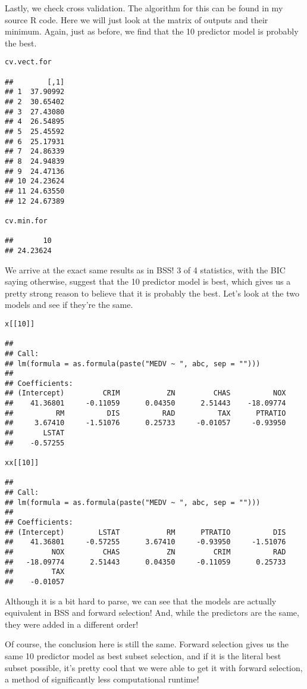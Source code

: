\documentclass[]{article}
\begin{document}
Lastly, we check cross validation. The algorithm for this can be found
in my source R code. Here we will just look at the matrix of outputs and
their minimum. Again, just as before, we find that the 10 predictor
model is probably the best.

\begin{verbatim}
cv.vect.for

##        [,1]
## 1  37.90992
## 2  30.65402
## 3  27.43080
## 4  26.54895
## 5  25.45592
## 6  25.17931
## 7  24.86339
## 8  24.94839
## 9  24.47136
## 10 24.23624
## 11 24.63550
## 12 24.67389

cv.min.for

##       10 
## 24.23624
\end{verbatim}

We arrive at the exact same results as in BSS! 3 of 4 statistics, with
the BIC saying otherwise, suggest that the 10 predictor model is best,
which gives us a pretty strong reason to believe that it is probably the
best. Let's look at the two models and see if they're the same.

\begin{verbatim}
x[[10]]

## 
## Call:
## lm(formula = as.formula(paste("MEDV ~ ", abc, sep = "")))
## 
## Coefficients:
## (Intercept)         CRIM           ZN         CHAS          NOX  
##    41.36801     -0.11059      0.04350      2.51443    -18.09774  
##          RM          DIS          RAD          TAX      PTRATIO  
##     3.67410     -1.51076      0.25733     -0.01057     -0.93950  
##       LSTAT  
##    -0.57255

xx[[10]]

## 
## Call:
## lm(formula = as.formula(paste("MEDV ~ ", abc, sep = "")))
## 
## Coefficients:
## (Intercept)        LSTAT           RM      PTRATIO          DIS  
##    41.36801     -0.57255      3.67410     -0.93950     -1.51076  
##         NOX         CHAS           ZN         CRIM          RAD  
##   -18.09774      2.51443      0.04350     -0.11059      0.25733  
##         TAX  
##    -0.01057
\end{verbatim}

Although it is a bit hard to parse, we can see that the models are
actually equivalent in BSS and forward selection! And, while the
predictors are the same, they were added in a different order!

Of course, the conclusion here is still the same. Forward selection
gives us the same 10 predictor model as best subset selection, and if it
is the literal best subset possible, it's pretty cool that we were able
to get it with forward selection, a method of significantly less
computational runtime!
\end{document}
